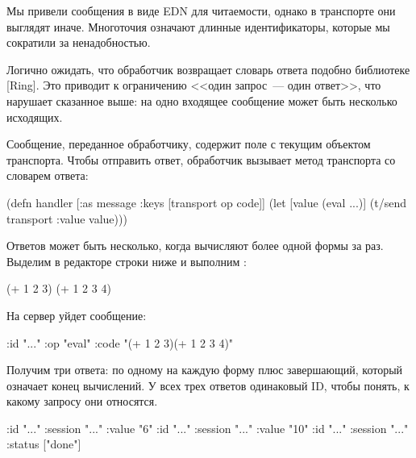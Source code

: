 Мы привели сообщения в виде EDN для читаемости, однако в транспорте они выглядят иначе. Многоточия означают длинные идентификаторы, которые мы сократили за ненадобностью.

Логично ожидать, что обработчик возвращает словарь ответа подобно библиотеке [Ring]. Это приводит к ограничению <<один запрос~--- один ответ>>, что нарушает сказанное выше: на одно входящее сообщение может быть несколько исходящих.

Сообщение, переданное обработчику, содержит поле  с текущим объектом транспорта. Чтобы отправить ответ, обработчик вызывает метод  транспорта со словарем ответа:

\begin{english}
  \begin{clojure}
(defn handler [{:as message
                :keys [transport op code]}]
  (let [value (eval ...)]
    (t/send transport {:value value})))
  \end{clojure}
\end{english}

Ответов может быть несколько, когда вычисляют более одной формы за раз. Выделим в редакторе строки ниже и выполним :

\begin{english}
  \begin{clojure}
(+ 1 2 3)
(+ 1 2 3 4)
  \end{clojure}
\end{english}

На сервер уйдет сообщение:

\begin{english}
  \begin{clojure}
{:id "..." :op "eval" :code "(+ 1 2 3)(+ 1 2 3 4)"}
  \end{clojure}
\end{english}

Получим три ответа: по одному на каждую форму плюс завершающий, который означает конец вычислений. У всех трех ответов одинаковый ID, чтобы понять, к какому запросу они относятся.

\begin{english}
  \begin{clojure}
{:id "..." :session "..." :value "6"}
{:id "..." :session "..." :value "10"}
{:id "..." :session "..." :status ["done"]}
  \end{clojure}
\end{english}

